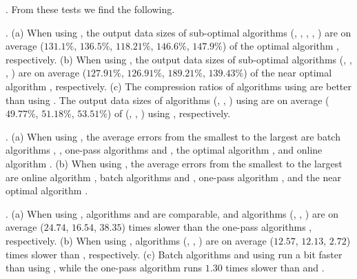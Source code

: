 
.
From these tests we find the following.

\emph{}. 
(a) When using \ped, the output data sizes of sub-optimal algorithms (\tpa,
\dpa, \bqsa, \siped, \operb) are on average ($131.1\%$, $136.5\%$, $118.21\%$, $146.6\%$, $147.9\%$)
of the optimal algorithm \optp, respectively.
(b) When using \sed, the output data sizes of sub-optimal algorithms (\tpa,
\dpa, \squishe, \cised) are on average ($127.91\%$, $126.91\%$, $189.21\%$, $139.43\%$) of the near optimal algorithm \nopts, respectively.
(c) The compression ratios of algorithms using \ped are better than
using \sed. The output data sizes of algorithms (\optp, \tpa, \dpa) using \ped
are on average ($49.77\%$, $51.18\%$, $53.51\%$) of (\nopts, \tpa, \dpa) using \sed, respectively.

\emph{}. 
(a) When using \ped, the average errors from the smallest to the largest are batch algorithms \tpa, \dpa, one-pass algorithms \siped and \operb, the optimal algorithm \optp, and online algorithm \bqsa. 
(b) When using \sed, the average errors from the smallest to the largest are online algorithm \squishe, batch algorithms \tpa and \dpa, one-pass algorithm \cised, and the near optimal algorithm \nopts.

\emph{}.
(a) When using \ped, algorithms \siped and \operb are comparable, and algorithms (\tpa, \dpa, \bqsa) are on average ($24.74$,
$16.54$, $38.35$) times slower than the one-pass algorithms \siped, respectively. 
(b) When using \sed, algorithms (\tpa, \dpa, \squishe) are on average ($12.57$, $12.13$, $2.72$) times slower than \cised, respectively.
(c) Batch algorithms \dpa and \tpa using \sed run a bit faster than using \ped, while the one-pass algorithm \cised runs {$1.30$} times slower than \siped and \operb.




